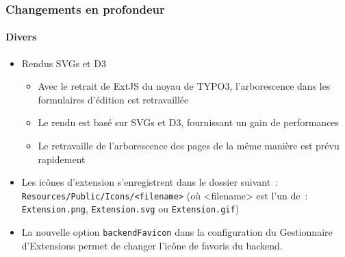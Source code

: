 \begin{frame}[fragile]
	\frametitle{Changements en profondeur}
	\framesubtitle{Divers}

	\begin{itemize}

		\item Rendus SVGs et D3

			\begin{itemize}
				\item Avec le retrait de ExtJS du noyau de TYPO3, l'arborescence dans les formulaires d'édition est retravaillée
				\item Le rendu est basé sur SVGs et D3, fournissant un gain de performances
				\item Le retravaille de l'arborescence des pages de la même manière est prévu rapidement
			\end{itemize}

		\item Les icônes d'extension s'enregistrent dans le dossier suivant~:\newline
			\small
				\texttt{Resources/Public/Icons/<filename>}
				(où <filename> est l'un de~: \texttt{Extension.png}, \texttt{Extension.svg} ou \texttt{Extension.gif})
			\normalsize

		\item La nouvelle option \texttt{backendFavicon} dans la configuration du Gestionnaire d'Extensions permet
			de changer l'icône de favoris du backend.

	\end{itemize}

\end{frame}

